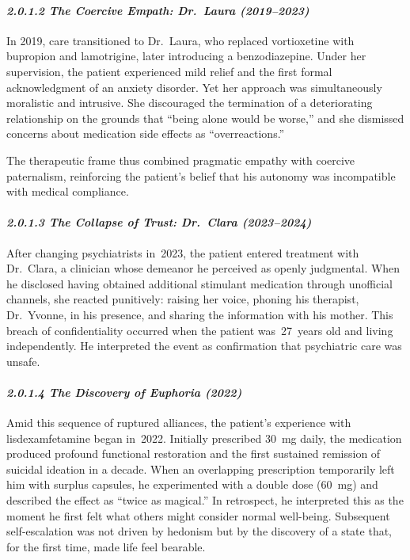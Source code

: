 \paragraph{\texorpdfstring{\emph{2.0.1.2 The Coercive Empath: Dr.~Laura (2019--2023)}}{2.0.1.2 The Coercive Empath: Dr.~Laura (2019--2023)}}\label{10b_traad-the-coercive-empath-dr.-laura-20192023}

In 2019, care transitioned to Dr.~Laura, who replaced vortioxetine with bupropion and lamotrigine, later introducing a benzodiazepine. Under her supervision, the patient experienced mild relief and the first formal acknowledgment of an anxiety disorder. Yet her approach was simultaneously moralistic and intrusive. She discouraged the termination of a deteriorating relationship on the grounds that ``being alone would be worse,'' and she dismissed concerns about medication side effects as ``overreactions.''

The therapeutic frame thus combined pragmatic empathy with coercive paternalism, reinforcing the patient's belief that his autonomy was incompatible with medical compliance.

\paragraph{\texorpdfstring{\emph{2.0.1.3 The Collapse of Trust: Dr.~Clara (2023--2024)}}{2.0.1.3 The Collapse of Trust: Dr.~Clara (2023--2024)}}\label{10b_traad-the-collapse-of-trust-dr.-clara-20232024}

After changing psychiatrists in~2023, the patient entered treatment with Dr.~Clara, a clinician whose demeanor he perceived as openly judgmental. When he disclosed having obtained additional stimulant medication through unofficial channels, she reacted punitively: raising her voice, phoning his therapist, Dr.~Yvonne, in his presence, and sharing the information with his mother. This breach of confidentiality occurred when the patient was~27~years old and living independently. He interpreted the event as confirmation that psychiatric care was unsafe.

\paragraph{\texorpdfstring{\emph{2.0.1.4 The Discovery of Euphoria (2022)}}{2.0.1.4 The Discovery of Euphoria (2022)}}\label{10b_traad-the-discovery-of-euphoria-2022}

Amid this sequence of ruptured alliances, the patient's experience with lisdexamfetamine began in~2022. Initially prescribed 30~mg daily, the medication produced profound functional restoration and the first sustained remission of suicidal ideation in a decade. When an overlapping prescription temporarily left him with surplus capsules, he experimented with a double dose (60~mg) and described the effect as ``twice as magical.'' In retrospect, he interpreted this as the moment he first felt what others might consider normal well-being. Subsequent self-escalation was not driven by hedonism but by the discovery of a state that, for the first time, made life feel bearable.

